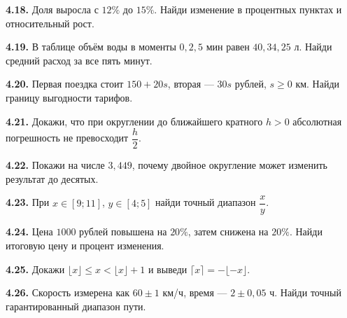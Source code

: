 \noindent\begin{minipage}[t]{\linewidth}\textbf{4.18.} Доля выросла с \(12\%\) до \(15\%\). Найди изменение в процентных пунктах и относительный рост.\par\end{minipage}\par
\noindent\begin{minipage}[t]{\linewidth}\textbf{4.19.} В таблице объём воды в моменты \(0,2,5\) мин равен \(40,34,25\) л. Найди средний расход за все пять минут.\par\end{minipage}\par
\noindent\begin{minipage}[t]{\linewidth}\textbf{4.20.} Первая поездка стоит \(150+20s\), вторая --- \(30s\) рублей, \(s\ge0\) км. Найди границу выгодности тарифов.\par\end{minipage}\par
\noindent\begin{minipage}[t]{\linewidth}\textbf{4.21.}\starmark{} Докажи, что при округлении до ближайшего кратного \(h>0\) абсолютная погрешность не превосходит \(\dfrac{h}{2}\).\par\end{minipage}\par
\noindent\begin{minipage}[t]{\linewidth}\textbf{4.22.}\starmark{} Покажи на числе \(3{,}449\), почему двойное округление может изменить результат до десятых.\par\end{minipage}\par
\noindent\begin{minipage}[t]{\linewidth}\textbf{4.23.}\starmark{} При \(x\in[9;11]\), \(y\in[4;5]\) найди точный диапазон \(\dfrac{x}{y}\).\par\end{minipage}\par
\noindent\begin{minipage}[t]{\linewidth}\textbf{4.24.} Цена \(1000\) рублей повышена на \(20\%\), затем снижена на \(20\%\). Найди итоговую цену и процент изменения.\par\end{minipage}\par
\noindent\begin{minipage}[t]{\linewidth}\textbf{4.25.}\starmark{} Докажи \(\lfloor x\rfloor\le x<\lfloor x\rfloor+1\) и выведи \(\lceil x\rceil=-\lfloor-x\rfloor\).\par\end{minipage}\par
\noindent\begin{minipage}[t]{\linewidth}\textbf{4.26.}\starmark{} Скорость измерена как \(60\pm1\) км/ч, время --- \(2\pm0{,}05\) ч. Найди точный гарантированный диапазон пути.\par\end{minipage}\par
\endgroup
